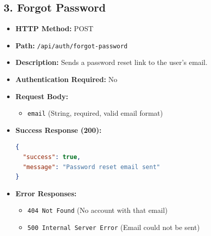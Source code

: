 \documentclass[12pt,a4paper]{article}
\begin{document}
\subsection{3. Forgot Password}
\begin{itemize}
    \item \textbf{HTTP Method:} POST
    \item \textbf{Path:} \texttt{/api/auth/forgot-password}
    \item \textbf{Description:} Sends a password reset link to the user's email.
    \item \textbf{Authentication Required:} No
    \item \textbf{Request Body:}
    \begin{itemize}
        \item \texttt{email} (String, required, valid email format)
    \end{itemize}
    \item \textbf{Success Response (200):}
\begin{lstlisting}[language=json]
{
  "success": true,
  "message": "Password reset email sent"
}
\end{lstlisting}
    \item \textbf{Error Responses:}
    \begin{itemize}
        \item \texttt{404 Not Found} (No account with that email)
        \item \texttt{500 Internal Server Error} (Email could not be sent)
    \end{itemize}
\end{itemize}
\end{document}
